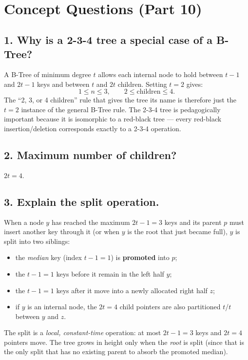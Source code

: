 \documentclass[11pt,a4paper]{article}
\begin{document}
\section{Concept Questions (Part 10)}

\subsection*{1. Why is a 2-3-4 tree a special case of a B-Tree?}
A B-Tree of minimum degree $t$ allows each internal node to hold between $t{-}1$ and $2t{-}1$ keys and between $t$ and $2t$ children. Setting $t = 2$ gives:
\[
    1 \leq n \leq 3, \qquad 2 \leq \text{children} \leq 4.
\]
The ``2, 3, or 4 children'' rule that gives the tree its name is therefore just the $t = 2$ instance of the general B-Tree rule. The 2-3-4 tree is pedagogically important because it is isomorphic to a red-black tree --- every red-black insertion/deletion corresponds exactly to a 2-3-4 operation.

\subsection*{2. Maximum number of children?}
$2t = 4$.

\subsection*{3. Explain the split operation.}
When a node $y$ has reached the maximum $2t{-}1 = 3$ keys and its parent $p$ must insert another key through it (or when $y$ is the root that just became full), $y$ is split into two siblings:

\begin{itemize}[leftmargin=1.3em,itemsep=0pt]
    \item the \emph{median} key (index $t{-}1 = 1$) is \textbf{promoted} into $p$;
    \item the $t{-}1 = 1$ keys before it remain in the left half $y$;
    \item the $t{-}1 = 1$ keys after it move into a newly allocated right half $z$;
    \item if $y$ is an internal node, the $2t = 4$ child pointers are also partitioned $t$/$t$ between $y$ and $z$.
\end{itemize}

The split is a \emph{local, constant-time} operation: at most $2t{-}1 = 3$ keys and $2t = 4$ pointers move. The tree grows in height only when the \emph{root} is split (since that is the only split that has no existing parent to absorb the promoted median).
\end{document}

